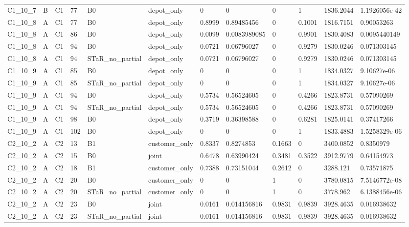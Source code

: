 \begin{longtable}{llllllllllll}
C1\_10\_7 & B & C1 & 77 & B0 & depot\_only & 0 & 0 & 0 & 1 & 1836.2044 & 1.1926056e-42 \\
C1\_10\_8 & A & C1 & 77 & B0 & depot\_only & 0.8999 & 0.89485456 & 0 & 0.1001 & 1816.7151 & 0.90053263 \\
C1\_10\_8 & A & C1 & 86 & B0 & depot\_only & 0.0099 & 0.0083989085 & 0 & 0.9901 & 1830.4083 & 0.0095440149 \\
C1\_10\_8 & A & C1 & 94 & B0 & depot\_only & 0.0721 & 0.06796027 & 0 & 0.9279 & 1830.0246 & 0.071303145 \\
C1\_10\_8 & A & C1 & 94 & STaR\_no\_partial & depot\_only & 0.0721 & 0.06796027 & 0 & 0.9279 & 1830.0246 & 0.071303145 \\
C1\_10\_9 & A & C1 & 85 & B0 & depot\_only & 0 & 0 & 0 & 1 & 1834.0327 & 9.10627e-06 \\
C1\_10\_9 & A & C1 & 85 & STaR\_no\_partial & depot\_only & 0 & 0 & 0 & 1 & 1834.0327 & 9.10627e-06 \\
C1\_10\_9 & A & C1 & 94 & B0 & depot\_only & 0.5734 & 0.56524605 & 0 & 0.4266 & 1823.8731 & 0.57090269 \\
C1\_10\_9 & A & C1 & 94 & STaR\_no\_partial & depot\_only & 0.5734 & 0.56524605 & 0 & 0.4266 & 1823.8731 & 0.57090269 \\
C1\_10\_9 & A & C1 & 98 & B0 & depot\_only & 0.3719 & 0.36398588 & 0 & 0.6281 & 1825.0141 & 0.37417266 \\
C1\_10\_9 & A & C1 & 102 & B0 & depot\_only & 0 & 0 & 0 & 1 & 1833.4883 & 1.5258329e-06 \\
C2\_10\_2 & A & C2 & 13 & B1 & customer\_only & 0.8337 & 0.8274853 & 0.1663 & 0 & 3400.0852 & 0.8350979 \\
C2\_10\_2 & A & C2 & 15 & B0 & joint & 0.6478 & 0.63990424 & 0.3481 & 0.3522 & 3912.9779 & 0.64154973 \\
C2\_10\_2 & A & C2 & 18 & B1 & customer\_only & 0.7388 & 0.73151044 & 0.2612 & 0 & 3288.121 & 0.73571875 \\
C2\_10\_2 & A & C2 & 20 & B0 & customer\_only & 0 & 0 & 1 & 0 & 3780.0815 & 7.5146772e-08 \\
C2\_10\_2 & A & C2 & 20 & STaR\_no\_partial & customer\_only & 0 & 0 & 1 & 0 & 3778.962 & 6.1388456e-06 \\
C2\_10\_2 & A & C2 & 23 & B0 & joint & 0.0161 & 0.014156816 & 0.9831 & 0.9839 & 3928.4635 & 0.016938632 \\
C2\_10\_2 & A & C2 & 23 & STaR\_no\_partial & joint & 0.0161 & 0.014156816 & 0.9831 & 0.9839 & 3928.4635 & 0.016938632 \\

\end{longtable}
